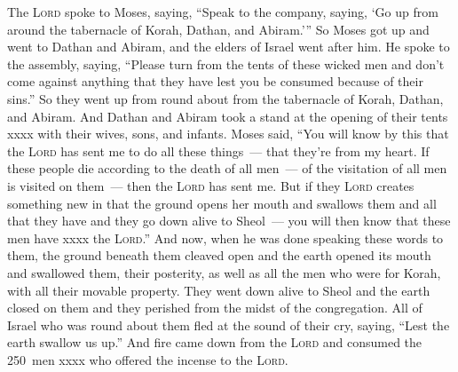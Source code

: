 \begin{inparaenum}
   The \textsc{Lord} spoke to Moses, saying,%
   ``Speak to the company, saying, `Go up from around the tabernacle of Korah, Dathan, and Abiram.'\thinspace''%
   So Moses got up and went to Dathan and Abiram, and the elders of Israel went after him.%
   He spoke to the assembly, saying, ``Please turn from the tents of these wicked men and don't come against anything that they have lest you be consumed because of their sins.''%
   So they went up from round about from the tabernacle of Korah, Dathan, and Abiram. And Dathan and Abiram took a stand at the opening of their tents xxxx with their wives, sons, and infants.%
   Moses said, ``You will know by this that the \textsc{Lord} has sent me to do all these things~--- that they're from my heart.%
   If these people die according to the death of all men~--- of the visitation of all men is visited on them~--- then the \textsc{Lord} has sent me.%
   But if they \textsc{Lord} creates something new in that the ground opens her mouth and swallows them and all that they have and they go down alive to Sheol~--- you will then know that these men have xxxx the \textsc{Lord}.''%
   And now, when he was done speaking these words to them, the ground beneath them cleaved open\understood%
   and the earth opened its mouth and swallowed them, their posterity, as well as all the men who were for Korah, with all their movable property.%
   They went down alive to Sheol and the earth closed on them and they perished from the midst of the congregation.%
   All of Israel who was round about them fled at the sound of their cry, saying, ``Lest the earth swallow us up.''%
   And fire came down from the \textsc{Lord} and consumed the 250~men xxxx who offered the incense to the \textsc{Lord}.%
\end{inparaenum}
